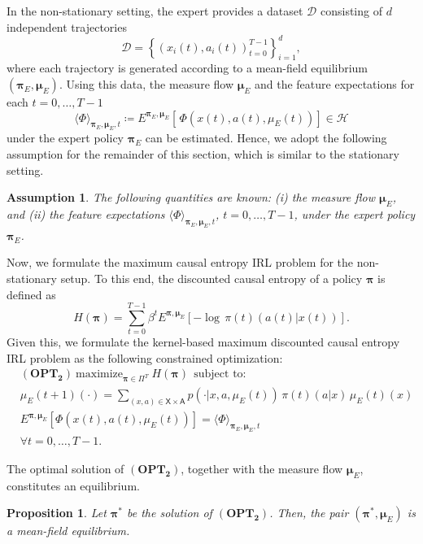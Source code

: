 \documentclass[11pt]{article}
\newcommand{\bmu}{{\boldsymbol \mu}}
\newcommand{\bpi}{{\boldsymbol \pi}}
\newcommand{\sX}{{\mathsf X}}
\newcommand{\sA}{{\mathsf A}}
\newcommand{\cH}{{\mathcal H}}
\newcommand{\D}{{\mathcal D}}
\newtheorem{proposition}{Proposition}[section]
\newtheorem{assumption}{Assumption}[section]
\begin{document}
    In the non-stationary setting,  the expert provides a dataset $\mathcal{D}$ consisting of $d$ independent trajectories
$$
\D=\left\{\left(x_i(t),a_i(t)\right)_{t=0}^{T-1}\right\}_{i=1}^d,
$$
where each trajectory is generated according to a mean-field equilibrium $(\bpi_E, \bmu_E)$. Using this data, the measure flow $\bmu_E$ and the feature expectations for each $t=0,\ldots,T-1$ 
$$\langle \Phi \rangle_{\bpi_E,\bmu_E,t} \coloneqq E^{\bpi_E,\bmu_E}\left[ \,\Phi(x(t),a(t),\mu_E(t))\right] \in \cH$$
under the expert policy $\bpi_E$ can be estimated. Hence, we adopt the following assumption for the remainder of this section, which is similar to the stationary setting.


\begin{assumption}
The following quantities are known: (i) the measure flow $\bmu_E$, and (ii) the feature expectations $\langle \Phi \rangle_{\bpi_E, \bmu_E,t}$, $t=0,\ldots,T-1$, under the expert policy $\bpi_E$.
\end{assumption}


Now, we formulate the maximum causal entropy IRL problem for the non-stationary setup. To this end, the discounted causal entropy of a policy $\bpi$ is defined as
$$
H(\bpi) = \sum_{t=0}^{T-1} \beta^t E^{\bpi,\bmu_E} \left[-\log \, \pi(t)(a(t)|x(t)) \right].
$$
Given this, we formulate the kernel-based maximum discounted causal entropy IRL problem as the following constrained optimization:
\begin{align*}
&\mathbf{(OPT_2)} \ \text{maximize}_{\bpi \in \Pi^T} \ H(\bpi) ~~ \text{subject to:} \\
&\mu_{E}(t+1)(\cdot) = \sum_{(x,a) \in \sX \times \sA} p(\cdot|x,a,\mu_{E}(t)) \, \pi(t)(a|x) \, \mu_{E}(t)(x) \\
&E^{\bpi,\bmu_E}[\Phi(x(t),a(t),\mu_E(t))] = \langle \Phi \rangle_{\bpi_E,\bmu_E,t} \\
&\forall t=0,\ldots,T-1.
\end{align*}

The optimal solution of \(\mathbf{(OPT_2)}\), together with the measure flow \(\bmu_E\), constitutes an equilibrium.

\begin{proposition} 
Let $\bpi^*$ be the solution of $\mathbf{\mathbf{(OPT_2)}}$. Then, the pair $(\bpi^*,\bmu_E)$ is a mean-field equilibrium.
\end{proposition}
\end{document}

